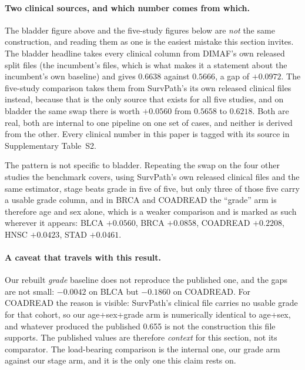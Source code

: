 \documentclass[11pt]{article}
\begin{document}
\paragraph{Two clinical sources, and which number comes from which.} The bladder figure above and
the five-study figures below are \emph{not} the same construction, and reading them as one is the
easiest mistake this section invites. The bladder headline takes every clinical column from
DIMAF's own released split files (the incumbent's files, which is what makes it a statement about the incumbent's own baseline) and gives $0.6638$ against $0.5666$, a gap of
$+0.0972$. The five-study comparison takes them from SurvPath's
its own released clinical files instead, because that is the only source that exists for all
five studies, and on bladder the same swap there is worth $+0.0560$ from $0.5658$ to $0.6218$.
Both are real, both are internal to one pipeline on one set of cases, and neither is derived from
the other. Every clinical number in this paper is tagged with its source in
Supplementary Table~S2.

The pattern is not specific to bladder. Repeating the swap on the four other studies the benchmark
covers, using SurvPath's own released clinical files and the same estimator, stage beats grade
in five of five, but only three of those five carry a usable grade column, and in
BRCA and COADREAD the ``grade'' arm is therefore age and sex alone, which is a weaker comparison
and is marked as such wherever it appears: BLCA $+0.0560$, BRCA $+0.0858$, COADREAD $+0.2208$, HNSC $+0.0423$, STAD
$+0.0461$.

\paragraph{A caveat that travels with this result.} Our rebuilt \emph{grade} baseline does not
reproduce the published one, and the gaps are not small: $-0.0042$ on BLCA but $-0.1860$ on
COADREAD. For COADREAD the reason is visible: SurvPath's clinical file carries no usable grade
for that cohort, so our age+sex+grade arm is numerically identical to age+sex, and whatever produced
the published 0.655 is not the construction this file supports. The published values are therefore
\emph{context} for this section, not its comparator. The load-bearing comparison is the internal
one, our grade arm against our stage arm, and it is the only one this claim rests on.
\end{document}
